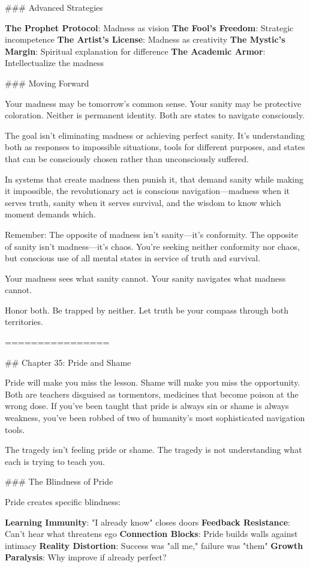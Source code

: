 \documentclass[12pt]{book}
\begin{document}
\#\#\# Advanced Strategies

\textbf{The Prophet Protocol}: Madness as vision
\textbf{The Fool's Freedom}: Strategic incompetence
\textbf{The Artist's License}: Madness as creativity
\textbf{The Mystic's Margin}: Spiritual explanation for difference
\textbf{The Academic Armor}: Intellectualize the madness

\#\#\# Moving Forward

Your madness may be tomorrow's common sense. Your sanity may be protective coloration. Neither is permanent identity. Both are states to navigate consciously.

The goal isn't eliminating madness or achieving perfect sanity. It's understanding both as responses to impossible situations, tools for different purposes, and states that can be consciously chosen rather than unconsciously suffered.

In systems that create madness then punish it, that demand sanity while making it impossible, the revolutionary act is conscious navigation—madness when it serves truth, sanity when it serves survival, and the wisdom to know which moment demands which.

Remember: The opposite of madness isn't sanity—it's conformity. The opposite of sanity isn't madness—it's chaos. You're seeking neither conformity nor chaos, but conscious use of all mental states in service of truth and survival.

Your madness sees what sanity cannot. Your sanity navigates what madness cannot.

Honor both. Be trapped by neither. Let truth be your compass through both territories.

================

\#\# Chapter 35: Pride and Shame

Pride will make you miss the lesson. Shame will make you miss the opportunity. Both are teachers disguised as tormentors, medicines that become poison at the wrong dose. If you've been taught that pride is always sin or shame is always weakness, you've been robbed of two of humanity's most sophisticated navigation tools.

The tragedy isn't feeling pride or shame. The tragedy is not understanding what each is trying to teach you.

\#\#\# The Blindness of Pride

Pride creates specific blindness:

\textbf{Learning Immunity}: "I already know" closes doors
\textbf{Feedback Resistance}: Can't hear what threatens ego
\textbf{Connection Blocks}: Pride builds walls against intimacy
\textbf{Reality Distortion}: Success was "all me," failure was "them"
\textbf{Growth Paralysis}: Why improve if already perfect?
\end{document}

